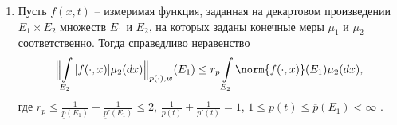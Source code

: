 {\begin{enumerate}
\item\label{lemmaNormUnderInt}
Пусть $f(x,t)$ -- измеримая функция, заданная на декартовом произведении $E_1 \times E_2$ множеств $E_1$ и $E_2$, на которых заданы конечные меры $\mu_1$ и $\mu_2$ соответственно. Тогда справедливо неравенство
\begin{equation}\label{normUnderInt}
  \Bigl\|\int\limits_{E_2}|f(\cdot,x)|\mu_2(dx)\Bigr\|_{p(\cdot),w}(E_1) \le
  r_p\int\limits_{E_2} \norm{f(\cdot,x)}(E_1)\mu_2(dx),
\end{equation}
где $r_p \le \frac{1}{\underline{p}(E_1)}+\frac{1}{\underline{p}'(E_1)} \le 2$,
$\frac{1}{p(t)}+\frac{1}{p'(t)}=1$, $1 \le p(t) \le \overline{p}(E_1) < \infty$
\cite{shii-monog-2012,mmg-haarspeed}.


\end{enumerate}
}


